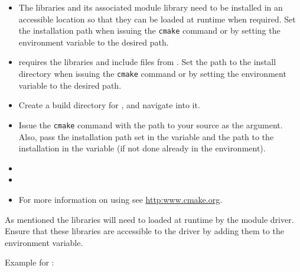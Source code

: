 \begin{itemize}
\item The \elmer libraries and its associated module library need to be installed in an accessible location so that they can be loaded at runtime when required. Set the installation path when issuing the \texttt{cmake} command or by setting the environment variable  to the desired path.
\item \irprogram requires the libraries and include files from \impact. Set the path to the \impact install directory when issuing the \texttt{cmake} command or by setting the environment variable  to the desired path.
\item Create a build directory for \elmer\!\!, and navigate into it.
\item{Issue the \texttt{cmake} command with the path to your \elmer source as the argument. Also, pass the installation path set in the  variable and the path to the \impact installation in the  variable (if not done already in the environment).}

\item {}
\item {}
\item For more information on using  see \url{http:www.cmake.org}.
\end{itemize}

As mentioned the \elmer libraries will need to loaded at runtime by the module driver. Ensure that these libraries are accessible to the driver by adding them to the  environment variable.

Example for :




